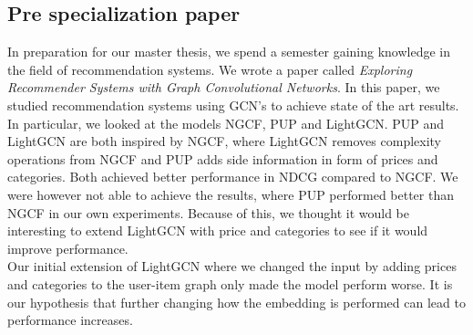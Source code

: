 \subsection{Pre specialization paper}
In preparation for our master thesis, we spend a semester gaining knowledge in the field of recommendation systems.
We wrote a paper called \textit{Exploring Recommender Systems with Graph Convolutional Networks}.
In this paper, we studied recommendation systems using GCN's to achieve state of the art results.
In particular, we looked at the models NGCF, PUP and LightGCN.
PUP and LightGCN are both inspired by NGCF, where LightGCN removes complexity operations from NGCF and PUP adds side information in form of prices and categories.
Both achieved better performance in NDCG compared to NGCF.
We were however not able to achieve the results, where PUP performed better than NGCF in our own experiments.
Because of this, we thought it would be interesting to extend LightGCN with price and categories to see if it would improve performance.
\\
Our initial extension of LightGCN where we changed the input by adding prices and categories to the user-item graph only made the model perform worse.
It is our hypothesis that further changing how the embedding is performed can lead to performance increases.
